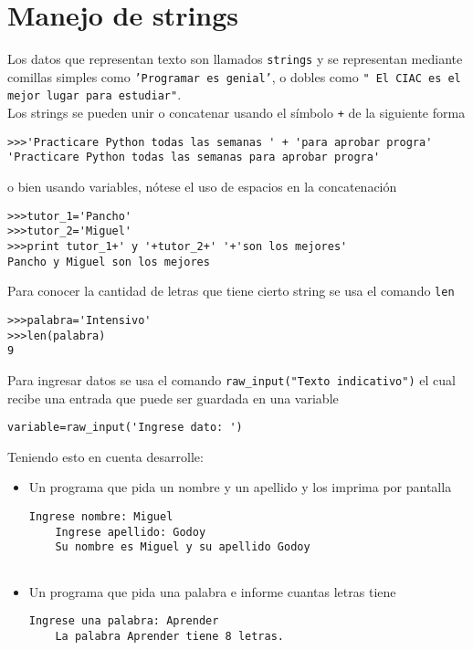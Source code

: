 \section{Manejo de strings}

Los datos que representan texto son llamados \texttt{strings} y se representan mediante comillas simples como \texttt{'Programar es genial'}, o dobles como \texttt{"\ El CIAC es el mejor lugar para estudiar"}.
\\
Los strings se pueden unir o concatenar usando el símbolo \texttt{+} de la siguiente forma

\begin{lstlisting}[style=consola]
>>>'Practicare Python todas las semanas ' + 'para aprobar progra'
'Practicare Python todas las semanas para aprobar progra'
\end{lstlisting}

o bien usando variables, nótese el uso de espacios en la concatenación

\begin{lstlisting}[style=consola]
>>>tutor_1='Pancho'
>>>tutor_2='Miguel'
>>>print tutor_1+' y '+tutor_2+' '+'son los mejores'
Pancho y Miguel son los mejores
\end{lstlisting}

Para conocer la cantidad de letras que tiene cierto string se usa el comando \texttt{len}

\begin{lstlisting}[style=consola]
>>>palabra='Intensivo'
>>>len(palabra)
9
\end{lstlisting}

Para ingresar datos se usa el comando \texttt{raw\_input("Texto indicativo")} el cual recibe una entrada que puede ser guardada en una variable

\begin{lstlisting}[style=consola]
variable=raw_input('Ingrese dato: ')
\end{lstlisting}

Teniendo esto en cuenta desarrolle:
\begin{itemize}
    \item Un programa que pida un nombre y un apellido y los imprima por pantalla
    \begin{lstlisting}[style=consola]
    Ingrese nombre: Miguel
    Ingrese apellido: Godoy
    Su nombre es Miguel y su apellido Godoy
    
    \end{lstlisting}
    
    \item Un programa que pida una palabra e informe cuantas letras tiene
    
    \begin{lstlisting}[style=consola]
    Ingrese una palabra: Aprender
    La palabra Aprender tiene 8 letras.
    \end{lstlisting}
    
\end{itemize}